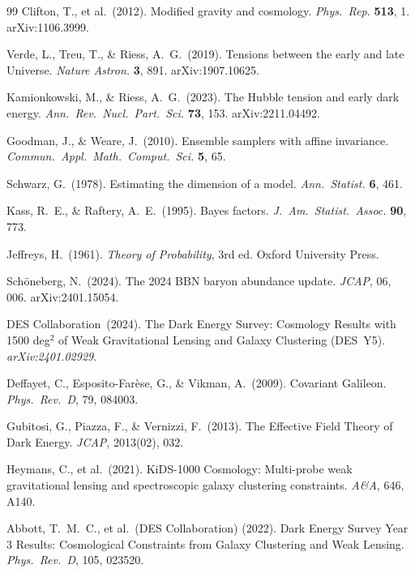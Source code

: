 \documentclass[12pt,a4paper]{article}
\begin{document}
\begin{thebibliography}{99}
Clifton, T., et al.\ (2012).
Modified gravity and cosmology.
\textit{Phys.\ Rep.} \textbf{513}, 1. arXiv:1106.3999.

Verde, L., Treu, T., \& Riess, A.~G.\ (2019).
Tensions between the early and late Universe.
\textit{Nature Astron.} \textbf{3}, 891. arXiv:1907.10625.

Kamionkowski, M., \& Riess, A.~G.\ (2023).
The Hubble tension and early dark energy.
\textit{Ann.\ Rev.\ Nucl.\ Part.\ Sci.} \textbf{73}, 153. arXiv:2211.04492.

Goodman, J., \& Weare, J.\ (2010).
Ensemble samplers with affine invariance.
\textit{Commun.\ Appl.\ Math.\ Comput.\ Sci.} \textbf{5}, 65.

Schwarz, G.\ (1978).
Estimating the dimension of a model.
\textit{Ann.\ Statist.} \textbf{6}, 461.

Kass, R.~E., \& Raftery, A.~E.\ (1995).
Bayes factors.
\textit{J.~Am.\ Statist.\ Assoc.} \textbf{90}, 773.

Jeffreys, H.\ (1961).
\textit{Theory of Probability}, 3rd ed.
Oxford University Press.

Sch\"oneberg, N.\ (2024).
The 2024 BBN baryon abundance update.
\textit{JCAP}, 06, 006. arXiv:2401.15054.

DES Collaboration\ (2024).
The Dark Energy Survey: Cosmology Results with 1500 deg$^2$ of Weak Gravitational Lensing and Galaxy Clustering (DES~Y5).
\textit{arXiv:2401.02929}.

Deffayet, C., Esposito-Farèse, G., \& Vikman, A.\ (2009).
Covariant Galileon.
\textit{Phys.~Rev.~D}, 79, 084003.

Gubitosi, G., Piazza, F., \& Vernizzi, F.\ (2013).
The Effective Field Theory of Dark Energy.
\textit{JCAP}, 2013(02), 032.

Heymans, C., et al.\ (2021).
KiDS-1000 Cosmology: Multi-probe weak gravitational lensing and spectroscopic galaxy clustering constraints.
\textit{A\&A}, 646, A140.

Abbott, T.~M.~C., et al.\ (DES Collaboration) (2022).
Dark Energy Survey Year 3 Results: Cosmological Constraints from Galaxy Clustering and Weak Lensing.
\textit{Phys.~Rev.~D}, 105, 023520.


\end{thebibliography}
\end{document}
